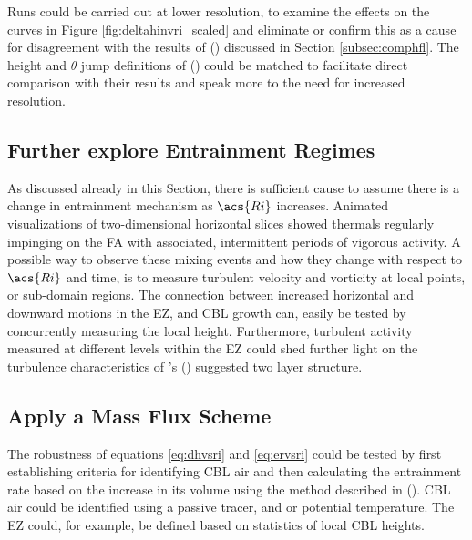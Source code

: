 Runs could be carried out at lower resolution, to examine the effects on the curves in Figure \ref{fig:deltahinvri_scaled} and eliminate or confirm this as a cause for disagreement with the results of \citeauthor{FedConzMir04} (\citeyear{FedConzMir04}) discussed in Section \ref{subsec:comphfl}.  The height and $\theta$ jump definitions of \citeauthor{GarciaMellado} (\citeyear{GarciaMellado}) could be matched to facilitate direct comparison with their results and speak more to the need for increased resolution.

\subsection{Further explore Entrainment Regimes}

As discussed already in this Section, there is sufficient cause to assume there is a change in entrainment mechanism as $\acs{Ri}$ increases.  Animated visualizations of two-dimensional horizontal slices showed thermals regularly impinging on the \acs{FA} with associated, intermittent periods of vigorous activity.  A possible way to observe these mixing events and how they change with respect to $\acs{Ri}$ and time, is to measure turbulent velocity and vorticity at local points, or sub-domain regions.  The connection between increased horizontal and downward motions in the \acs{EZ}, and \acs{CBL} growth can, easily be tested by concurrently measuring the local height. Furthermore, turbulent activity measured at different levels within the \acs{EZ} could shed further light on the turbulence characteristics of \citeauthor{GarciaMellado}'s (\citeyear{GarciaMellado}) suggested two layer structure.\\     

\subsection{Apply a Mass Flux Scheme}

The robustness of equations \ref{eq:dhvsri} and \ref{eq:ervsri} could be tested by first establishing criteria for identifying \acs{CBL} air and then calculating the entrainment rate based on the increase in its volume using the method described in \citeauthor{DawAus} (\citeyear{DawAus}).  \acs{CBL} air could be identified using a passive tracer, and or potential temperature.  The \acs{EZ} could, for example, be defined based on statistics of local \acs{CBL} heights.   

\FloatBarrier


\endinput

Any text after an \endinput is ignored.
You could put scraps here or things in progress.
